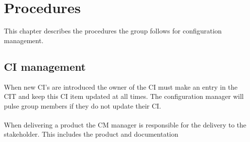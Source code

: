 \chapter{Procedures}
This chapter describes the procedures the group follows for configuration management.

\section{CI management}
When new CI's are introduced the owner of the CI must make an entry in the CIT and keep this CI item updated at all times. The configuration manager will pulse group members if they do not update their CI. 
~\\
~\\
When delivering a product the CM manager is responsible for the delivery to the stakeholder. This includes the product and documentation